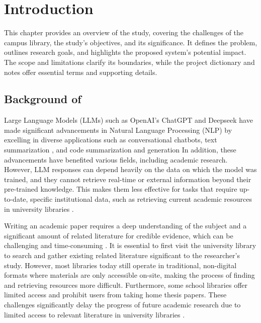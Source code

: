 
\chapter{Introduction}


\hspace{1cm}This chapter provides an overview of the study, covering the challenges of the campus library, the study’s objectives, and its significance. It defines the problem, outlines research goals, and highlights the proposed system’s potential impact. The scope and limitations clarify its boundaries, while the project dictionary and notes offer essential terms and supporting details. 

\begin{refsection}
\section{Background of }
\hspace{1cm}Large Language Models (LLMs) such as OpenAI's ChatGPT \cite{achiam2023gpt}  and Deepseek \cite{guo2025deepseek} have made significant advancements in Natural Language Processing (NLP) by excelling in diverse applications such as conversational chatbots, text summarization \cite{lewis2019bart}, and code summarization and generation \cite{nijkamp2022codegen,chen2021evaluating}
 In addition, these advancements have benefited various fields, including academic research. However, LLM responses can depend heavily on the data on which the model was trained, and they cannot retrieve real-time or external information beyond their pre-trained knowledge. This makes them less effective for tasks that require up-to-date, specific institutional data, such as retrieving current academic resources in university libraries \cite{liu2024information}.

\bigbreak
\hspace{0.4cm}Writing an academic paper requires a deep understanding of the subject and a significant amount of related literature for credible evidence, which can be challenging and time-consuming \cite{khalifa2024using}. It is essential to first visit the university library to search and gather existing related literature significant to the researcher’s study.  However, most libraries today still operate in traditional, non-digital formats where materials are only accessible on-site, making the process of finding and retrieving resources more difficult. Furthermore, some school libraries offer limited access and prohibit users from taking home thesis papers. These challenges significantly delay the progress of future academic research due to limited access to relevant literature in university libraries \cite{prajapat2022comparative}. 



\end{refsection}
